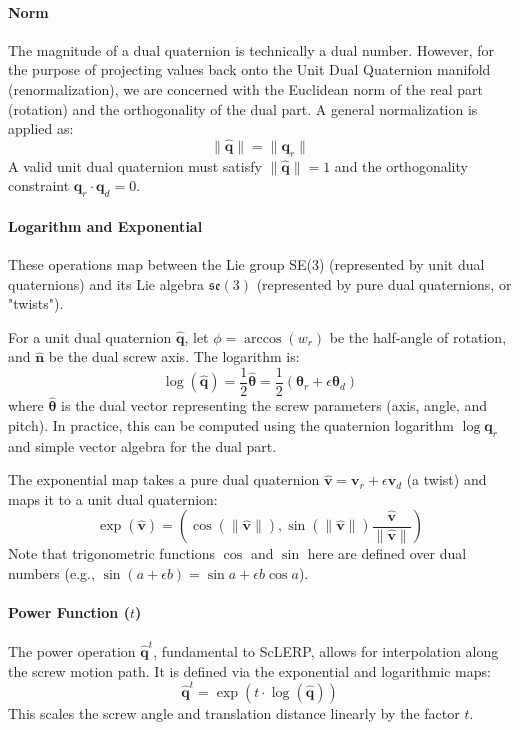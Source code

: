 \documentclass[a4paper,11pt]{article}
\begin{document}
\paragraph{Norm}
The magnitude of a dual quaternion is technically a dual number. However, for the purpose of projecting values back onto the Unit Dual Quaternion manifold (renormalization), we are concerned with the Euclidean norm of the real part (rotation) and the orthogonality of the dual part. A general normalization is applied as:
\begin{equation}
    \|\hat{\bm{q}}\| = \|\bm{q}_r\|
\end{equation}
A valid unit dual quaternion must satisfy $\|\hat{\bm{q}}\| = 1$ and the orthogonality constraint $\bm{q}_r \cdot \bm{q}_d = 0$.

\paragraph{Logarithm and Exponential}
These operations map between the Lie group SE(3) (represented by unit dual quaternions) and its Lie algebra $\mathfrak{se}(3)$ (represented by pure dual quaternions, or "twists").

For a unit dual quaternion $\hat{\bm{q}}$, let $\phi = \arccos(w_r)$ be the half-angle of rotation, and $\hat{\bm{n}}$ be the dual screw axis. The logarithm is:
\begin{equation}
    \log(\hat{\bm{q}}) = \frac{1}{2} \hat{\bm{\theta}} = \frac{1}{2} (\bm{\theta}_r + \epsilon \bm{\theta}_d)
\end{equation}
where $\hat{\bm{\theta}}$ is the dual vector representing the screw parameters (axis, angle, and pitch). In practice, this can be computed using the quaternion logarithm $\log \bm{q}_r$ and simple vector algebra for the dual part.

The exponential map takes a pure dual quaternion $\hat{\bm{v}} = \bm{v}_r + \epsilon \bm{v}_d$ (a twist) and maps it to a unit dual quaternion:
\begin{equation}
    \exp(\hat{\bm{v}}) = \left( \cos(\|\hat{\bm{v}}\|), \sin(\|\hat{\bm{v}}\|) \frac{\hat{\bm{v}}}{\|\hat{\bm{v}}\|} \right)
\end{equation}
Note that trigonometric functions $\cos$ and $\sin$ here are defined over dual numbers (e.g., $\sin(a+\epsilon b) = \sin a + \epsilon b \cos a$).

\paragraph{Power Function ($t$)}
The power operation $\hat{\bm{q}}^t$, fundamental to ScLERP, allows for interpolation along the screw motion path. It is defined via the exponential and logarithmic maps:
\begin{equation}
    \hat{\bm{q}}^t = \exp( t \cdot \log(\hat{\bm{q}}) )
\end{equation}
This scales the screw angle and translation distance linearly by the factor $t$.
\end{document}
